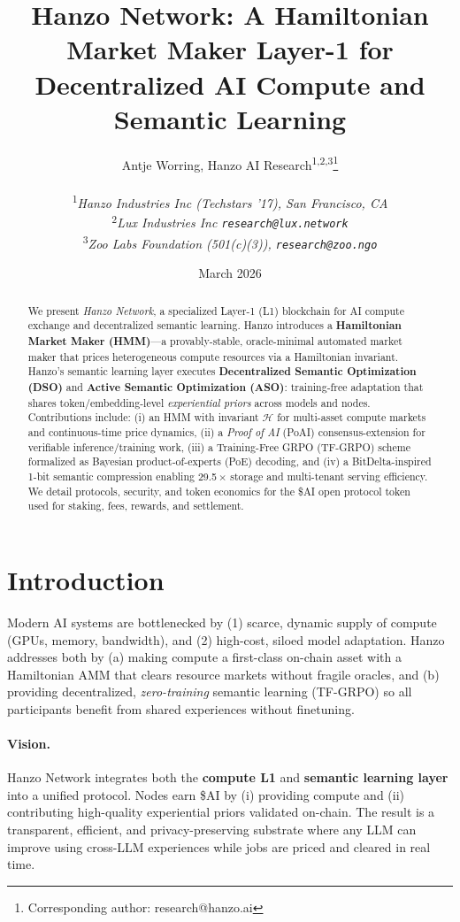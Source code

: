 \documentclass[11pt]{article}
\title{Hanzo Network: A Hamiltonian Market Maker Layer-1 for Decentralized AI Compute and Semantic Learning}
\author{
    Antje Worring, Hanzo AI Research\textsuperscript{1,2,3}\thanks{Corresponding author: research@hanzo.ai} \\
    \\
    \textsuperscript{1}\textit{Hanzo Industries Inc (Techstars '17), San Francisco, CA} \\
    \textsuperscript{2}\textit{Lux Industries Inc \texttt{research@lux.network}} \\
    \textsuperscript{3}\textit{Zoo Labs Foundation (501(c)(3)), \texttt{research@zoo.ngo}}
}
\date{March 2026}
\begin{document}
\hanzocoverpage

\begin{abstract}
We present \emph{Hanzo Network}, a specialized Layer-1 (L1) blockchain for AI compute exchange and decentralized semantic learning. Hanzo introduces a \textbf{Hamiltonian Market Maker (HMM)}---a provably-stable, oracle-minimal automated market maker that prices heterogeneous compute resources via a Hamiltonian invariant. Hanzo's semantic learning layer executes \textbf{Decentralized Semantic Optimization (DSO)} and \textbf{Active Semantic Optimization (ASO)}: training-free adaptation that shares token/embedding-level \emph{experiential priors} across models and nodes. Contributions include: (i) an HMM with invariant \(\mathcal H\) for multi-asset compute markets and continuous-time price dynamics, (ii) a \emph{Proof of AI} (PoAI) consensus-extension for verifiable inference/training work, (iii) a Training-Free GRPO (TF-GRPO) scheme formalized as Bayesian product-of-experts (PoE) decoding, and (iv) a BitDelta-inspired 1-bit semantic compression enabling 29.5\,$\times$ storage and multi-tenant serving efficiency. We detail protocols, security, and token economics for the \$AI open protocol token used for staking, fees, rewards, and settlement.
\end{abstract}

\section{Introduction}
Modern AI systems are bottlenecked by (1) scarce, dynamic supply of compute (GPUs, memory, bandwidth), and (2) high-cost, siloed model adaptation. Hanzo addresses both by (a) making compute a first-class on-chain asset with a Hamiltonian AMM that clears resource markets without fragile oracles, and (b) providing decentralized, \emph{zero-training} semantic learning (TF-GRPO) so all participants benefit from shared experiences without finetuning.

\paragraph{Vision.} Hanzo Network integrates both the \textbf{compute L1} and \textbf{semantic learning layer} into a unified protocol. Nodes earn \$AI by (i) providing compute and (ii) contributing high-quality experiential priors validated on-chain. The result is a transparent, efficient, and privacy-preserving substrate where any LLM can improve using cross-LLM experiences while jobs are priced and cleared in real time.
\end{document}
